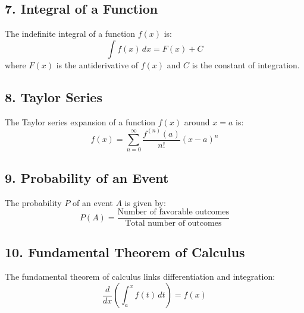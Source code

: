 \documentclass{article}
\begin{document}
	\subsection{7. Integral of a Function}
	The indefinite integral of a function \(f(x)\) is:
	\[
	\int f(x) \, dx = F(x) + C
	\]
	where \(F(x)\) is the antiderivative of \(f(x)\) and \(C\) is the constant of integration.
	
	\subsection{8. Taylor Series}
	The Taylor series expansion of a function \(f(x)\) around \(x = a\) is:
	\[
	f(x) = \sum_{n=0}^{\infty} \frac{f^{(n)}(a)}{n!} (x - a)^n
	\]
	
	\subsection{9. Probability of an Event}
	The probability \(P\) of an event \(A\) is given by:
	\[
	P(A) = \frac{\text{Number of favorable outcomes}}{\text{Total number of outcomes}}
	\]
	
	\subsection{10. Fundamental Theorem of Calculus}
	The fundamental theorem of calculus links differentiation and integration:
	\[
	\frac{d}{dx} \left( \int_{a}^{x} f(t) \, dt \right) = f(x)
	\]
	
\end{document}
